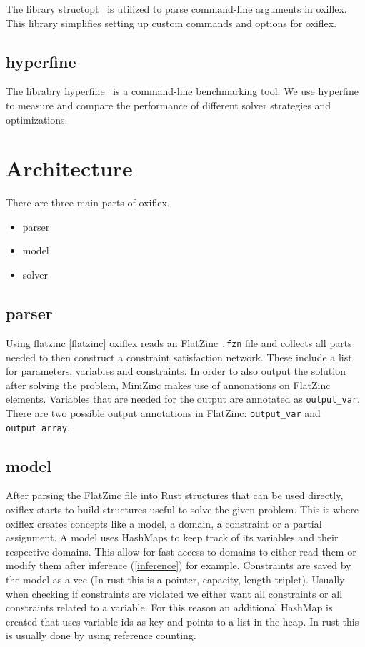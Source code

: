 The library structopt~\cite{structopt:2020} is utilized to parse command-line arguments in oxiflex. This library simplifies setting up custom commands and options for oxiflex.

\subsection{hyperfine}

The librabry hyperfine~\cite{hyperfine:2023} is a command-line benchmarking tool. We use hyperfine to measure and compare the performance of different solver strategies and optimizations.

\section{Architecture}

There are three main parts of oxiflex.

\begin{itemize}
	\item parser
	\item model
	\item solver
\end{itemize}

\subsection{parser}

Using flatzinc \ref{flatzinc} oxiflex reads an FlatZinc \verb|.fzn| file and collects all parts needed to then construct a constraint satisfaction network. These include a list for parameters, variables and constraints. In order to also output the solution after solving the problem, MiniZinc makes use of annonations on FlatZinc elements. Variables that are needed for the output are annotated as \verb|output_var|. There are two possible output annotations in FlatZinc: \verb|output_var| and \verb|output_array|.

\subsection{model}

After parsing the FlatZinc file into Rust structures that can be used directly, oxiflex starts to build structures useful to solve the given problem. This is where oxiflex creates concepts like a model, a domain, a constraint or a partial assignment. A model uses HashMaps to keep track of its variables and their respective domains. This allow for fast access to domains to either read them or modify them after inference (\ref{inference}) for example. Constraints are saved by the model as a vec (In rust this is a pointer, capacity, length triplet). Usually when checking if constraints are violated we either want all constraints or all constraints related to a variable. For this reason an additional HashMap is created that uses variable ids as key and points to a list in the heap. In rust this is usually done by using reference counting.

